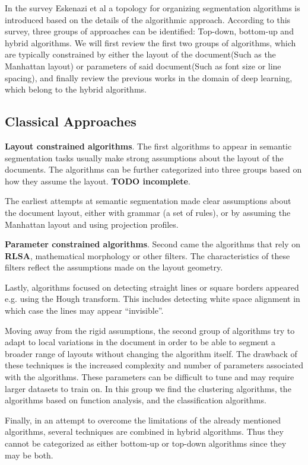 \documentclass[english, bibtex]{kththesis}
\begin{document}
In the survey Eskenazi et al\cite{ESKENAZI20171} a topology for organizing segmentation algorithms is introduced based on the details of the algorithmic approach. According to this survey, three groups of approaches can be identified: Top-down, bottom-up and hybrid algorithms. We will first review the first two groups of algorithms, which are typically constrained by either the layout of the document(Such as the Manhattan layout) or parameters of said document(Such as font size or line spacing), and finally review the previous works in the domain of deep learning, which belong to the hybrid algorithms.

\subsection{Classical Approaches}

\textbf{Layout constrained algorithms}. The first algorithms to appear in semantic segmentation tasks usually make strong assumptions about the layout of the documents. The algorithms can be further categorized into three groups based on how they assume the layout. \textbf{TODO incomplete}.

The earliest attempts at semantic segmentation made clear assumptions about the document layout, either with grammar (a set of rules), or by assuming the Manhattan layout and using projection profiles.
    
\textbf{Parameter constrained algorithms}. Second came the algorithms that rely on \textbf{RLSA}, mathematical morphology or other filters. The characteristics of these filters reflect the assumptions made on the layout geometry. 
    
Lastly, algorithms focused on detecting straight lines or square borders appeared e.g. using the Hough transform. This includes detecting white space alignment in which case the lines may appear “invisible”.
    
Moving away from the rigid assumptions, the second group of algorithms try to adapt to local variations in the document in order to be able to segment a broader range of layouts without changing the algorithm itself. The drawback of these techniques is the increased complexity and number of parameters associated with the algorithms. These parameters can be difficult to tune and may require larger datasets to train on. In this group we find the clustering algorithms, the algorithms based on function analysis, and the classification algorithms. 

Finally, in an attempt to overcome the limitations of the already mentioned algorithms, several techniques are combined in hybrid algorithms. Thus they cannot be categorized as either bottom-up or top-down algorithms since they may be both.  
\end{document}
